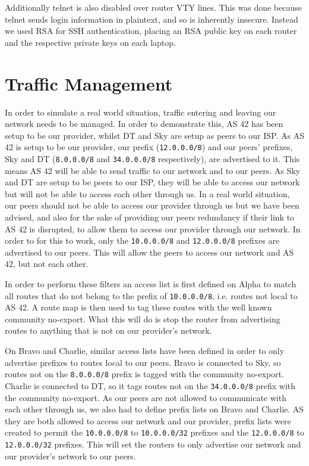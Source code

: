Additionally telnet is also disabled over router VTY lines. This was done because
telnet sends login information in plaintext, and so is inherently insecure.
Instead we used RSA for SSH authentication, placing an RSA public key on each
router and the respective private keys on each laptop.


\section{Traffic Management}
In order to simulate a real world situation, traffic entering and leaving our
network needs to be managed. In order to demonstrate this, AS 42 has been setup
to be our provider, whilst DT and Sky are setup as peers to our ISP. As AS 42 is
setup to be our provider, our prefix (\texttt{12.0.0.0/8}) and our peers'
prefixes, Sky and DT (\texttt{8.0.0.0/8} and \texttt{34.0.0.0/8} respectively),
are advertised to it. This means AS 42 will be able to send traffic to our
network and to our peers. As Sky and DT are setup to be peers to our ISP, they
will be able to access our network but will not be able to access each other
through us. In a real world situation, our peers should not be able to access
our provider through us but we have been advised, and also for the sake of
providing our peers redundancy if their link to AS 42 is disrupted, to allow
them to access our provider through our network. In order to for this to work,
only the \texttt{10.0.0.0/8} and \texttt{12.0.0.0/8} prefixes are advertised to
our peers. This will allow the peers to access our network and AS 42, but not
each other.

In order to perform these filters an access list is first defined on Alpha to
match all routes that do not belong to the prefix of \texttt{10.0.0.0/8}, i.e.
routes not local to AS 42. A route map is then used to tag these routes with the
well known community no-export. What this will do is stop the router from
advertising routes to anything that is not on our provider's network.

On Bravo and Charlie, similar access lists have been defined in order to only
advertise prefixes to routes local to our peers. Bravo is connected to Sky, so
routes not on the \texttt{8.0.0.0/8} prefix is tagged with the community
no-export. Charlie is connected to DT, so it tags routes not on the
\texttt{34.0.0.0/8} prefix with the community no-export. As our peers are not
allowed to communicate with each other through us, we also had to define prefix
lists on Bravo and Charlie. AS they are both allowed to access our network and
our provider, prefix lists were created to permit the \texttt{10.0.0.0/8} to
\texttt{10.0.0.0/32} prefixes and the \texttt{12.0.0.0/8} to
\texttt{12.0.0.0/32} prefixes. This will set the routers to only advertise our
network and our provider's network to our peers.

